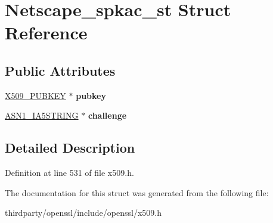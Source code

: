 \hypertarget{struct_netscape__spkac__st}{}\section{Netscape\+\_\+spkac\+\_\+st Struct Reference}
\label{struct_netscape__spkac__st}
\subsection*{Public Attributes}
\begin{DoxyCompactItemize}
\item 
\mbox{\label{struct_netscape__spkac__st_ae1285ccf2bfbc84f2d57085f39a9bcd2}} 
\hyperlink{struct_x509__pubkey__st}{X509\+\_\+\+P\+U\+B\+K\+EY} $\ast$ {\bfseries pubkey}
\item 
\mbox{\label{struct_netscape__spkac__st_a7d21d91f0b8eab8b5fca8d3adef478ba}} 
\hyperlink{structasn1__string__st}{A\+S\+N1\+\_\+\+I\+A5\+S\+T\+R\+I\+NG} $\ast$ {\bfseries challenge}
\end{DoxyCompactItemize}


\subsection{Detailed Description}


Definition at line 531 of file x509.\+h.



The documentation for this struct was generated from the following file\+:\begin{DoxyCompactItemize}
\item 
thirdparty/openssl/include/openssl/x509.\+h\end{DoxyCompactItemize}
